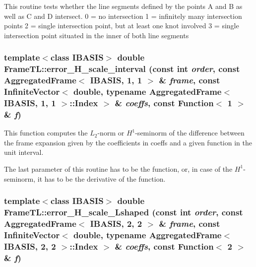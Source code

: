 This routine tests whether the line segments defined by the points A and B as well as C and D intersect. 0 = no intersection 1 = infinitely many intersection points 2 = single intersection point, but at least one knot involved 3 = single intersection point situated in the inner of both line segments \hypertarget{namespaceFrameTL_addaaee53d308a6093a25ed95f86cc85}{
\subsubsection[error\_\-H\_\-scale\_\-interval]{\setlength{\rightskip}{0pt plus 5cm}template$<$class IBASIS$>$ double FrameTL::error\_\-H\_\-scale\_\-interval (const int {\em order}, \/  const AggregatedFrame$<$ IBASIS, 1, 1 $>$ \& {\em frame}, \/  const InfiniteVector$<$ double, typename AggregatedFrame$<$ IBASIS, 1, 1 $>$::Index $>$ \& {\em coeffs}, \/  const Function$<$ 1 $>$ \& {\em f})}}
\label{namespaceFrameTL_addaaee53d308a6093a25ed95f86cc85}


This function computes the $L_2$-norm or $H^1$-seminorm of the difference between the frame expansion given by the coefficients in coeffs and a given function in the unit interval. 

The last parameter of this routine has to be the function, or, in case of the $H^1$-seminorm, it has to be the derivative of the function. \hypertarget{namespaceFrameTL_54aa679fc30456b9ca268846c1926992}{
\subsubsection[error\_\-H\_\-scale\_\-Lshaped]{\setlength{\rightskip}{0pt plus 5cm}template$<$class IBASIS$>$ double FrameTL::error\_\-H\_\-scale\_\-Lshaped (const int {\em order}, \/  const AggregatedFrame$<$ IBASIS, 2, 2 $>$ \& {\em frame}, \/  const InfiniteVector$<$ double, typename AggregatedFrame$<$ IBASIS, 2, 2 $>$::Index $>$ \& {\em coeffs}, \/  const Function$<$ 2 $>$ \& {\em f})}}
\label{namespaceFrameTL_54aa679fc30456b9ca268846c1926992}


